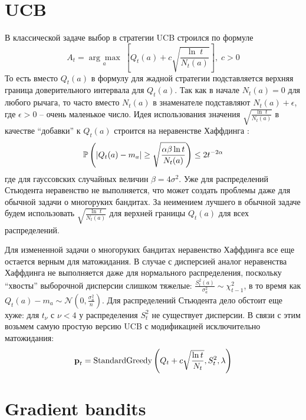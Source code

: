 \section{UCB}
В классической задаче выбор в стратегии UCB строился по формуле
\[
A_t = \underset{a}{\arg \max} \; \left[ Q_t(a) + c \sqrt{\frac{\ln \; t}{N_t(a)}} \right], \; c > 0
\]
То есть вместо $Q_t(a)$ в формулу для жадной стратегии подставляется верхняя граница доверительного интервала для $Q_t(a)$. Так как в начале $N_t(a) = 0$ для любого рычага, то часто вместо $N_t(a)$ в знаменателе подставляют $N_t(a) + \epsilon$, где $\epsilon >0$ -- очень маленькое число. Идея использования значения $\sqrt{\frac{\ln \; t}{N_t(a)}}$ в качестве ``добавки'' к $Q_t(a)$ строится на неравенстве Хаффдинга \cite{intro_bandits_ucb}:
\[
\mathbb{P}\left( |Q_t(a) - m_a| \geq \sqrt{\frac{\alpha \beta \ln t}{N_t(a)}} \right) \leq 2 t^{-2 \alpha}
\]
где для гауссовских случайных величин $\beta = 4 \sigma^2$. Уже для распределений Стьюдента неравенство не выполняется, что может создать проблемы даже для обычной задачи о многоруких бандитах. За неимением лучшего в обычной задаче будем использовать $\sqrt{\frac{\ln \; t}{N_t(a)}}$ для верхней границы $Q_t(a)$ для всех распределений.

Для измененной задачи о многоруких бандитах неравенство Хаффдинга все еще остается верным для матожидания. В случае с дисперсией аналог неравенства Хаффдинга не выполняется даже для нормального распределения, поскольку ``хвосты'' выборочной дисперсии слишком тяжелые: $\frac{S_t^2(a)}{\sigma_a^2} \sim \chi_{t-1}^2$, в то время как $Q_t(a) - m_a \sim \mathcal{N}(0, \frac{\sigma_a^2}{n})$. Для распределений Стьюдента дело обстоит еще хуже: для $t_{\nu}$ с $\nu < 4$ у распределения $S_t^2$ не существует дисперсии. В связи с этим возьмем самую простую версию UCB с модификацией исключительно матожидания:
\[
\textbf{p}_t = \text{StandardGreedy}\left(Q_t + c \sqrt{\frac{\ln t}{N_t}}, S_t^2, \lambda \right)
\]

\section{Gradient bandits}

